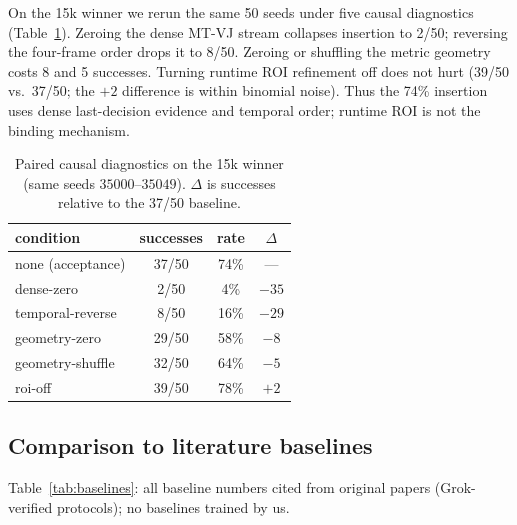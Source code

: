 \documentclass[10pt,twocolumn]{article}
\begin{document}
On the 15k winner we rerun the same 50 seeds under five causal diagnostics
(Table~\ref{tab:task35-causal}). Zeroing the dense MT-VJ stream collapses
insertion to 2/50; reversing the four-frame order drops it to 8/50.
Zeroing or shuffling the metric geometry costs 8 and 5 successes.
Turning runtime ROI refinement off does not hurt (39/50 vs.\ 37/50; the
$+2$ difference is within binomial noise). Thus the 74\% insertion uses
dense last-decision evidence and temporal order; runtime ROI is not the
binding mechanism.

\begin{table}[t]
\centering\small
\caption{Paired causal diagnostics on the 15k winner (same seeds
$35000$--$35049$). $\Delta$ is successes relative to the 37/50 baseline.}
\label{tab:task35-causal}
\begin{tabular}{lccc}
\toprule
condition & successes & rate & $\Delta$ \\
\midrule
none (acceptance) & 37/50 & 74\% & --- \\
dense-zero & 2/50 & 4\% & $-35$ \\
temporal-reverse & 8/50 & 16\% & $-29$ \\
geometry-zero & 29/50 & 58\% & $-8$ \\
geometry-shuffle & 32/50 & 64\% & $-5$ \\
roi-off & 39/50 & 78\% & $+2$ \\
\bottomrule
\end{tabular}
\end{table}

\subsection{Comparison to literature baselines}
\label{sec:baselines}
Table~\ref{tab:baselines}: all baseline numbers cited from original papers
(Grok-verified protocols); no baselines trained by us.
\end{document}
